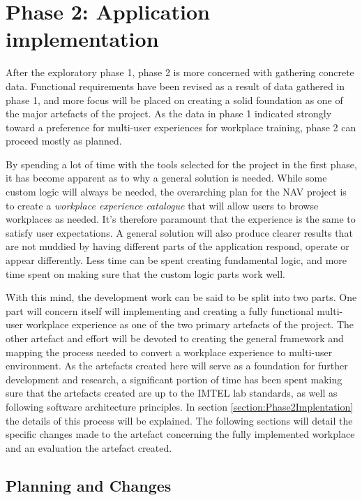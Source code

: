 
\chapter{Phase 2:  Application implementation}
\label{chap:phase2}

After the exploratory phase 1, phase 2 is more concerned with gathering concrete data. Functional requirements have been revised as a result of data gathered in phase 1, and more focus will be placed on creating a solid foundation as one of the major artefacts of the project. As the data in phase 1 indicated strongly toward a preference for multi-user experiences for workplace training, phase 2 can proceed mostly as planned.

By spending a lot of time with the tools selected for the project in the first phase, it has become apparent as to why a general solution is needed. While some custom logic will always be needed, the overarching plan for the NAV project is to create a \textit{workplace experience catalogue} that will allow users to browse workplaces as needed. It's therefore paramount that the experience is the same to satisfy user expectations. A general solution will also produce clearer results that are not muddied by having different parts of the application respond, operate or appear differently. Less time can be spent creating fundamental logic, and more time spent on making sure that the custom logic parts work well.

With this mind, the development work can be said to be split into two parts. One part will concern itself will implementing and creating a fully functional multi-user workplace experience as one of the two primary artefacts of the project. The other artefact and effort will be devoted to creating the general framework and mapping the process needed to convert a workplace experience to multi-user environment. As the artefacts created here will serve as a foundation for further development and research, a significant portion of time has been spent making sure that the artefacts created are up to the IMTEL lab standards, as well as following software architecture principles. In section \ref{section:Phase2Implentation} the details of this process will be explained. The following sections will detail the specific changes made to the artefact concerning the fully implemented workplace and an evaluation the artefact created.


\section{Planning and Changes}



